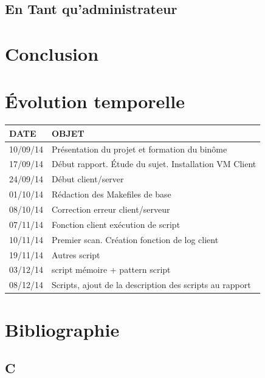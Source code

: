 \documentclass[11pt,a4paper,titlepage, oneside]{article}
\begin{document}
	\subsection{{\color{blue}En Tant qu'administrateur}}
	
\newpage
\section{{\color{red}Conclusion}}

\newpage
\section{{\color{red}Évolution temporelle}}
\begin{tabular}{|l|p{12cm}|}
	\hline
		
		\textbf{DATE}& \textbf{OBJET} \\
		
	\hline
		10/09/14 & Présentation du projet et formation du binôme\\
	\hline
		17/09/14 & Début rapport. Étude du sujet. Installation VM Client\\
	\hline
		24/09/14 & Début client/server\\
	\hline
		01/10/14 & Rédaction des Makefiles de base\\
	\hline
		08/10/14 & Correction erreur client/serveur\\
	\hline
		07/11/14 & Fonction client exécution de script\\
	\hline
		10/11/14 & Premier scan. Création fonction de log client\\
	\hline
		19/11/14 & Autres script\\
	\hline
		03/12/14 & script mémoire + pattern script\\
	\hline
		08/12/14 & Scripts, ajout de la description des scripts au rapport\\
	\hline
		
		

\end{tabular}
		



\newpage
\section{{\color{red}Bibliographie}}
	\subsection*{{\color{blue}C}}
		
\end{document}
